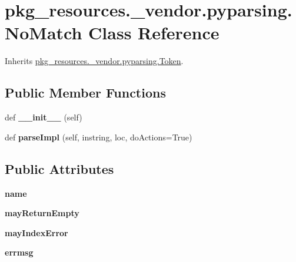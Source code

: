 \hypertarget{classpkg__resources_1_1__vendor_1_1pyparsing_1_1_no_match}{}\section{pkg\+\_\+resources.\+\_\+vendor.\+pyparsing.\+No\+Match Class Reference}
\label{classpkg__resources_1_1__vendor_1_1pyparsing_1_1_no_match}


Inherits \hyperlink{classpkg__resources_1_1__vendor_1_1pyparsing_1_1_token}{pkg\+\_\+resources.\+\_\+vendor.\+pyparsing.\+Token}.

\subsection*{Public Member Functions}
\begin{DoxyCompactItemize}
\item 
\mbox{\label{classpkg__resources_1_1__vendor_1_1pyparsing_1_1_no_match_a29475dfbd1bb637def2004784099c028}} 
def {\bfseries \+\_\+\+\_\+init\+\_\+\+\_\+} (self)
\item 
\mbox{\label{classpkg__resources_1_1__vendor_1_1pyparsing_1_1_no_match_ab7f6922ad9c6da0f0ec43495c311c8ae}} 
def {\bfseries parse\+Impl} (self, instring, loc, do\+Actions=True)
\end{DoxyCompactItemize}
\subsection*{Public Attributes}
\begin{DoxyCompactItemize}
\item 
\mbox{\label{classpkg__resources_1_1__vendor_1_1pyparsing_1_1_no_match_ad6959859e1396e991c7fe2eed2e17c87}} 
{\bfseries name}
\item 
\mbox{\label{classpkg__resources_1_1__vendor_1_1pyparsing_1_1_no_match_acd7a2b95d75976694875f30528655872}} 
{\bfseries may\+Return\+Empty}
\item 
\mbox{\label{classpkg__resources_1_1__vendor_1_1pyparsing_1_1_no_match_a0f6ac6114eec05b18a803b1451e2639a}} 
{\bfseries may\+Index\+Error}
\item 
\mbox{\label{classpkg__resources_1_1__vendor_1_1pyparsing_1_1_no_match_a51441bc458a6c10425a544188c904748}} 
{\bfseries errmsg}
\end{DoxyCompactItemize}
